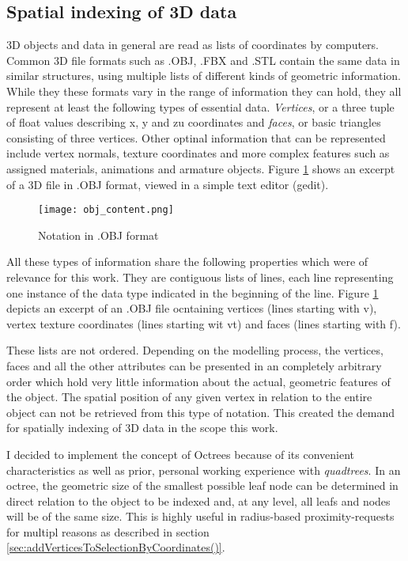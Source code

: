 		\subsection{Spatial indexing of 3D data}
		\label{sec:impl_spatial_indexing_3d}
3D objects and data in general are read as lists of coordinates by computers. Common 3D file formats such as .OBJ, .FBX and .STL contain the same data in similar structures, using multiple lists of different kinds of geometric information. While they these formats vary in the range of information they can hold, they all represent at least the following types of essential data. \textit{Vertices}, or a three tuple of float values describing x, y and zu coordinates and \textit{faces}, or basic triangles consisting of three vertices. Other optinal information that can be represented include vertex normals, texture coordinates and more complex features such as assigned materials, animations and armature objects. Figure \ref{fig:obj_content} shows an excerpt of a 3D file in .OBJ format, viewed in a simple text editor (gedit).

\begin{figure}[htb]
  \centering
  \texttt{[image: obj\_content.png]}\\ %
  \caption{Notation in .OBJ format}\label{fig:obj_content}
\end{figure}

All these types of information share the following properties which were of relevance for this work. They are contiguous lists of lines, each line representing one instance of the data type indicated in the beginning of the line. Figure \ref{fig:obj_content} depicts an excerpt of an .OBJ file ocntaining vertices (lines starting with v), vertex texture coordinates (lines starting wit vt) and faces (lines starting with f).

These lists are not ordered. Depending on the modelling process, the vertices, faces and all the other attributes can be presented in an completely arbitrary order which hold very little information about the actual, geometric features of the object. The spatial position of any given vertex in relation to the entire object can not be retrieved from this type of notation. This created the demand for spatially indexing of 3D data in the scope this work.

I decided to implement the concept of Octrees \cite{Octree} because of its convenient characteristics as well as prior, personal working experience with \textit{quadtrees}. In an octree, the geometric size of the smallest possible leaf node can be determined in direct relation to the object to be indexed and, at any level, all leafs and nodes will be of the same size. This is highly useful in radius-based proximity-requests for multipl reasons as described in section \ref{sec:addVerticesToSelectionByCoordinates()}.

